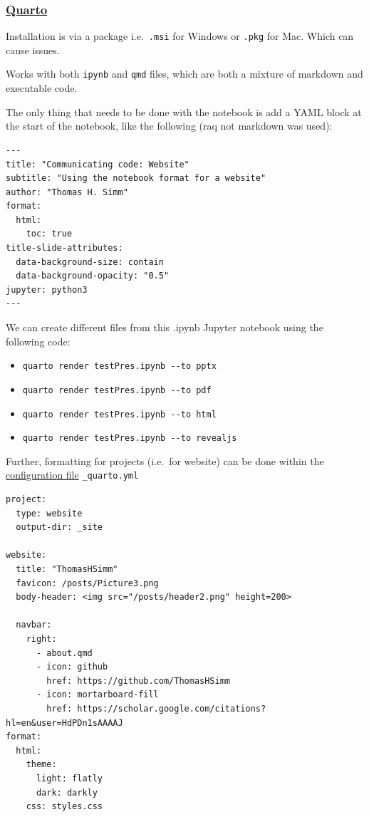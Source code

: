\documentclass[
  letterpaper,
  DIV=11,
  numbers=noendperiod]{scrartcl}
\providecommand{\tightlist}{%
  \setlength{\itemsep}{0pt}\setlength{\parskip}{0pt}}\usepackage{longtable,booktabs,array}
\begin{document}
\hypertarget{quarto}{%
\subsubsection{\texorpdfstring{\href{https://quarto.org/docs/get-started/hello/vscode.html}{Quarto}}{Quarto}}\label{quarto}}

Installation is via a package i.e.~\texttt{.msi} for Windows or
\texttt{.pkg} for Mac. Which can cause issues.

Works with both \texttt{ipynb} and \texttt{qmd} files, which are both a
mixture of markdown and executable code.

The only thing that needs to be done with the notebook is add a YAML
block at the start of the notebook, like the following (raq not markdown
was used):

\begin{verbatim}
---
title: "Communicating code: Website"
subtitle: "Using the notebook format for a website"
author: "Thomas H. Simm"
format:
  html:
    toc: true
title-slide-attributes:
  data-background-size: contain
  data-background-opacity: "0.5"
jupyter: python3
---
\end{verbatim}

We can create different files from this .ipynb Jupyter notebook using
the following code:

\begin{itemize}
\tightlist
\item
  \texttt{quarto\ render\ testPres.ipynb\ -\/-to\ pptx}
\item
  \texttt{quarto\ render\ testPres.ipynb\ -\/-to\ pdf}
\item
  \texttt{quarto\ render\ testPres.ipynb\ -\/-to\ html}
\item
  \texttt{quarto\ render\ testPres.ipynb\ -\/-to\ revealjs}
\end{itemize}

Further, formatting for projects (i.e.~for website) can be done within
the
\href{https://quarto.org/docs/projects/quarto-projects.html\#shared-metadata}{configuration
file} \texttt{\_quarto.yml}

\begin{verbatim}
project:
  type: website
  output-dir: _site

website:
  title: "ThomasHSimm"
  favicon: /posts/Picture3.png
  body-header: <img src="/posts/header2.png" height=200>

  navbar:
    right:
      - about.qmd
      - icon: github
        href: https://github.com/ThomasHSimm
      - icon: mortarboard-fill
        href: https://scholar.google.com/citations?hl=en&user=HdPDn1sAAAAJ
format:
  html:
    theme: 
      light: flatly
      dark: darkly
    css: styles.css
\end{verbatim}
\end{document}
